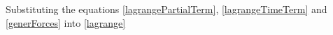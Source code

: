 \documentclass[sublist,a4paper,twoside,11pt]{article}
\begin{document}
Substituting the equations \eqref{lagrangePartialTerm}, \eqref{lagrangeTimeTerm} and \eqref{generForces} into \eqref{lagrange}
\end{document}
